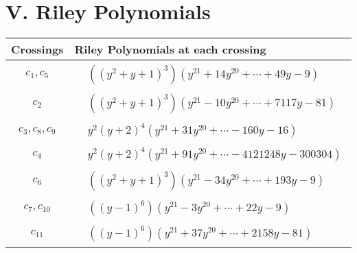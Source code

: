\documentclass[1p]{elsarticle_modified}
\theoremstyle{definition}
\begin{document}
\centering \section*{ V. Riley Polynomials}
\begin{tabular}{m{50pt}|m{274pt}}
Crossings & \hspace{64pt}Riley Polynomials at each crossing \\
\hline $$\begin{aligned}c_{1},c_{5}\end{aligned}$$&$\begin{aligned}
&((y^2+y+1)^3)(y^{21}+14 y^{20}+\cdots+49 y-9)
\end{aligned}$\\
\hline $$\begin{aligned}c_{2}\end{aligned}$$&$\begin{aligned}
&((y^2+y+1)^3)(y^{21}-10 y^{20}+\cdots+7117 y-81)
\end{aligned}$\\
\hline $$\begin{aligned}c_{3},c_{8},c_{9}\end{aligned}$$&$\begin{aligned}
&y^2(y+2)^4(y^{21}+31 y^{20}+\cdots-160 y-16)
\end{aligned}$\\
\hline $$\begin{aligned}c_{4}\end{aligned}$$&$\begin{aligned}
&y^2(y+2)^4(y^{21}+91 y^{20}+\cdots-4121248 y-300304)
\end{aligned}$\\
\hline $$\begin{aligned}c_{6}\end{aligned}$$&$\begin{aligned}
&((y^2+y+1)^3)(y^{21}-34 y^{20}+\cdots+193 y-9)
\end{aligned}$\\
\hline $$\begin{aligned}c_{7},c_{10}\end{aligned}$$&$\begin{aligned}
&((y-1)^6)(y^{21}-3 y^{20}+\cdots+22 y-9)
\end{aligned}$\\
\hline $$\begin{aligned}c_{11}\end{aligned}$$&$\begin{aligned}
&((y-1)^6)(y^{21}+37 y^{20}+\cdots+2158 y-81)
\end{aligned}$\\
\hline
\end{tabular}
\vskip 2pc
\end{document}

